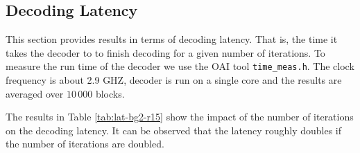 \documentclass{article}
\begin{document}
\newpage
\subsection{Decoding Latency}
\label{sec:decoding-time}

This section provides results in terms of decoding latency. That is, the time it takes the decoder to to finish decoding for a given number of iterations. To measure the run time of the decoder we use the OAI tool \texttt{time\_meas.h}. The clock frequency is about 2.9 GHZ, decoder is run on a single core and the results are averaged over $10\,000$ blocks.

The results in Table \ref{tab:lat-bg2-r15} show the impact of the number of iterations on the decoding latency. It can be observed that the latency roughly doubles if the number of iterations are doubled.
\end{document}
